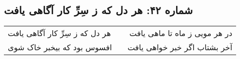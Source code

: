 \begin{center}
\section*{شماره ۴۲: هر دل که ز سِرِّ کار آگاهی یافت}
\label{sec:042}
\begin{longtable}{l p{0.5cm} r}
هر دل که ز سِرِّ کار آگاهی یافت
&&
در هر مویی ز ماه تا ماهی یافت
\\
افسوس بود که بیخبر خاک شوی
&&
آخر بشتاب اگر خبر خواهی یافت
\\
\end{longtable}
\end{center}
